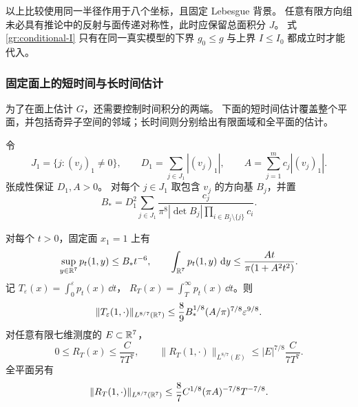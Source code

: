 \begin{remark}
以上比较使用同一半径作用于八个坐标，且固定 Lebesgue 背景。
任意有限方向组未必具有推论中的反射与面传递对称性，此时应保留总面积分 $J$。
式 \eqref{gr:conditional-I} 只有在同一真实模型的下界 $g_0\le g$ 与上界 $I\le I_0$ 都成立时才能代入。
\end{remark}

\subsubsection{固定面上的短时间与长时间估计}

为了在面上估计 $G$，还需要控制时间积分的两端。
下面的短时间估计覆盖整个平面，并包括奇异子空间的邻域；长时间则分别给出有限面域和全平面的估计。

令
\[
 J_1=\{j:(v_j)_1\ne0\},\qquad
 D_1=\sum_{j\in J_1}|(v_j)_1|,\qquad
 A=\sum_{j=1}^mc_j|(v_j)_1|.
\]
张成性保证 $D_1,A>0$。
对每个 $j\in J_1$ 取包含 $v_j$ 的方向基 $B_j$，并置
\begin{equation}\label{gr:face-B}
 B_* =D_1^2\sum_{j\in J_1}
 \frac{c_j}{\pi^8|\det B_j|\prod_{i\in B_j\setminus\{j\}}c_i}.
\end{equation}

\begin{proposition}\label{gr:face-estimates}
对每个 $t>0$，固定面 $x_1=1$ 上有
\begin{equation}\label{gr:face-pointwise}
 \sup_{y\in\mathbb{R}^7}p_t(1,y)\le B_*t^{-6},\qquad
 \int_{\mathbb{R}^7}p_t(1,y)\,\,\mathrm d y
 \le\frac{At}{\pi(1+A^2t^2)}.
\end{equation}
记
$T_\varepsilon(x)=\int_0^\varepsilon p_t(x)\,\dd t$，
$R_T(x)=\int_T^\infty p_t(x)\,\dd t$。则
\begin{equation}\label{gr:short-time}
 \|T_\varepsilon(1,\cdot)\|_{L^{8/7}(\mathbb{R}^7)}
 \le\frac89B_*^{1/8}(A/\pi)^{7/8}\varepsilon^{9/8}.
\end{equation}
对任意有限七维测度的 $E\subset\mathbb{R}^7$，
\begin{equation}\label{gr:long-compact}
 0\le R_T(x)\le\frac C{7T^7},\qquad
 \|R_T(1,\cdot)\|_{L^{8/7}(E)}
 \le |E|^{7/8}\frac C{7T^7}.
\end{equation}
全平面另有
\begin{equation}\label{gr:long-plane}
 \|R_T(1,\cdot)\|_{L^{8/7}(\mathbb{R}^7)}
 \le\frac87C^{1/8}(\pi A)^{-7/8}T^{-7/8}.
\end{equation}
\end{proposition}

